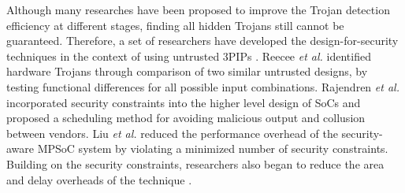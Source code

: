 \documentclass[10pt,journal]{IEEEtran}
\begin{document}
Although many researches have been proposed to improve the Trojan detection efficiency at different stages, finding all hidden Trojans still cannot be guaranteed. Therefore, a set of researchers have developed the design-for-security techniques in the context of using untrusted 3PIPs \cite{article:JR3} \cite{article:SS}. Reecee \textit{et al.} \cite{article:TR} identified hardware Trojans through comparison of two similar untrusted designs, by testing functional differences for all possible input combinations. Rajendren \textit{et al.} \cite{conference:JR2} incorporated security constraints into the higher level design of SoCs and proposed a scheduling method for avoiding malicious output and collusion between vendors. Liu \textit{et al.} \cite{article:CL} reduced the performance overhead of the security-aware MPSoC system by violating a minimized number of security constraints. Building on the security constraints, researchers also began to reduce the area and delay overheads of the technique \cite{article:NW} \cite{conference:AS}.


\end{document}
